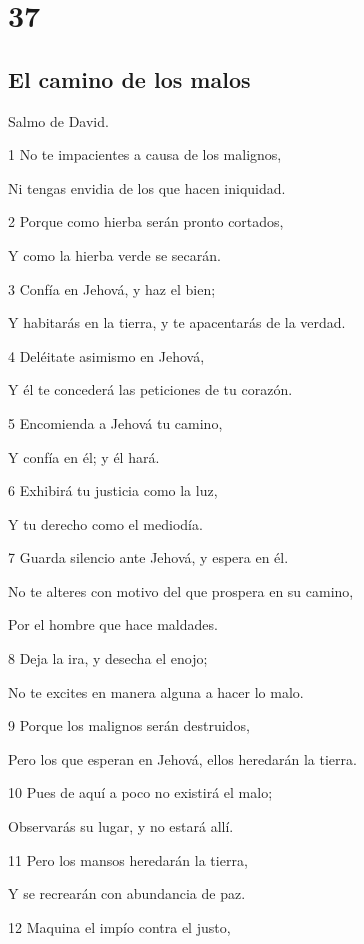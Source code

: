 \chapter{37}

\section*{El camino de los malos}

\par Salmo de David.

\par 1 No te impacientes a causa de los malignos,
\par Ni tengas envidia de los que hacen iniquidad.
\par 2 Porque como hierba serán pronto cortados,
\par Y como la hierba verde se secarán.
\par 3 Confía en Jehová, y haz el bien;
\par Y habitarás en la tierra, y te apacentarás de la verdad.
\par 4 Deléitate asimismo en Jehová,
\par Y él te concederá las peticiones de tu corazón.
\par 5 Encomienda a Jehová tu camino,
\par Y confía en él; y él hará.
\par 6 Exhibirá tu justicia como la luz,
\par Y tu derecho como el mediodía.
\par 7 Guarda silencio ante Jehová, y espera en él.
\par No te alteres con motivo del que prospera en su camino,
\par Por el hombre que hace maldades.
\par 8 Deja la ira, y desecha el enojo;
\par No te excites en manera alguna a hacer lo malo.
\par 9 Porque los malignos serán destruidos,
\par Pero los que esperan en Jehová, ellos heredarán la tierra.
\par 10 Pues de aquí a poco no existirá el malo;
\par Observarás su lugar, y no estará allí.
\par 11 Pero los mansos heredarán la tierra,
\par Y se recrearán con abundancia de paz.
\par 12 Maquina el impío contra el justo,
